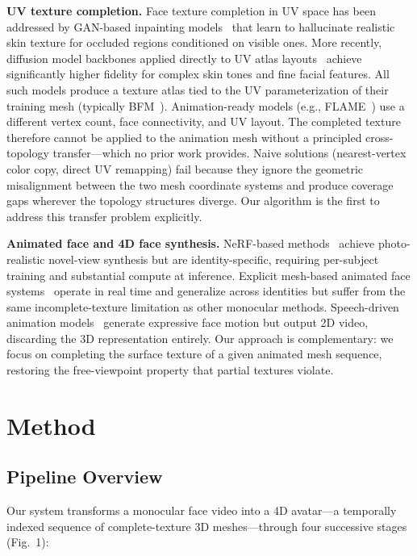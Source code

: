 \documentclass[conference]{IEEEtran}
\begin{document}
\medskip\noindent\textbf{UV texture completion.}
Face texture completion in UV space has been addressed by GAN-based inpainting
models~\cite{deng2018uvgan} that learn to hallucinate realistic skin texture
for occluded regions conditioned on visible ones. More recently, diffusion model
backbones applied directly to UV atlas layouts~\cite{bai2023uvidm} achieve
significantly higher fidelity for complex skin tones and fine facial features.
All such models produce a texture atlas tied to the UV parameterization of their
training mesh (typically BFM~\cite{paysan2009bfm}). Animation-ready models
(e.g., FLAME~\cite{li2017learning}) use a different vertex count, face
connectivity, and UV layout. The completed texture therefore cannot be applied
to the animation mesh without a principled cross-topology transfer---which no
prior work provides. Naive solutions (nearest-vertex color copy, direct UV
remapping) fail because they ignore the geometric misalignment between the two
mesh coordinate systems and produce coverage gaps wherever the topology
structures diverge. Our algorithm is the first to address this transfer
problem explicitly.

\medskip\noindent\textbf{Animated face and 4D face synthesis.}
NeRF-based methods~\cite{guo2021adnerf,park2021nerfface} achieve
photo-realistic novel-view synthesis but are identity-specific, requiring
per-subject training and substantial compute at inference. Explicit mesh-based
animated face systems~\cite{thies2016face2face,fried2019text} operate in real
time and generalize across identities but suffer from the same
incomplete-texture limitation as other monocular methods. Speech-driven
animation models~\cite{xing2023codetalker} generate expressive face motion but
output 2D video, discarding the 3D representation entirely. Our approach is
complementary: we focus on completing the surface texture of a given animated
mesh sequence, restoring the free-viewpoint property that partial textures
violate.

\section{Method}

\subsection{Pipeline Overview}

Our system transforms a monocular face video into a 4D avatar---a temporally
indexed sequence of complete-texture 3D meshes---through four successive stages
(Fig.~1):
\end{document}
